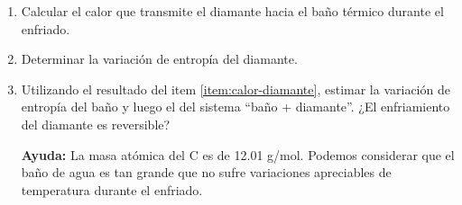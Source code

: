 \documentclass[a4paper,11pt]{article}
\begin{document}
\begin{enumerate}[label=(\alph*),
                  leftmargin=2\parindent,
                  rightmargin=2\parindent]

    \item{\label{item:calor-diamante}
          Calcular el calor que transmite el diamante hacia el baño 
          térmico durante el enfriado.}
    
    \item{Determinar la variación de entropía del diamante.}
    
    \item{Utilizando el resultado del item \ref{item:calor-diamante}, 
          estimar la variación de entropía del baño y luego el del sistema
          ``baño + diamante''. ¿El enfriamiento del diamante es 
          reversible?
          }
    
    {\small
    \textbf{Ayuda:}
    La masa atómica del C es de 12.01 g/mol.
    Podemos considerar que el baño de agua es tan grande que no sufre 
    variaciones apreciables de temperatura durante el enfriado.
    }

\end{enumerate}
\end{document}

